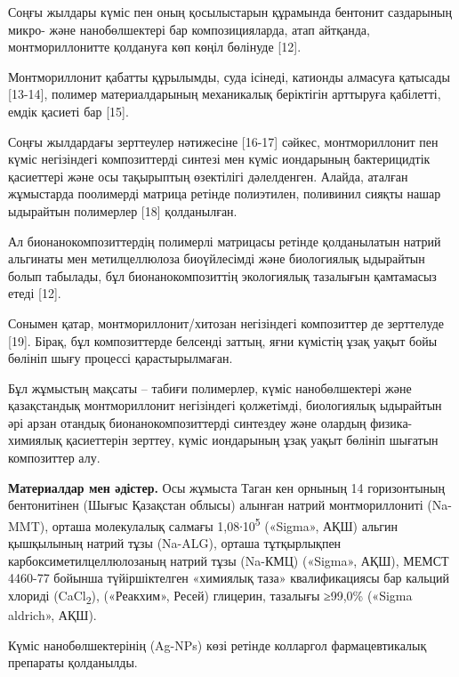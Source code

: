 Соңғы жылдары күміс пен оның қосылыстарын құрамында бентонит саздарының
микро- және нанобөлшектері бар композицияларда, атап айтқанда,
монтмориллонитте қолдануға көп көңіл бөлінуде {[}12{]}.

Монтмориллонит қабатты құрылымды, суда ісінеді, катионды алмасуға
қатысады {[}13-14{]}, полимер материалдарының механикалық беріктігін
арттыруға қабілетті, емдік қасиеті бар {[}15{]}.

Соңғы жылдардағы зерттеулер нәтижесіне {[}16-17{]} сәйкес,
монтмориллонит пен күміс негізіндегі композиттерді синтезі мен күміс
иондарының бактерицидтік қасиеттері және осы тақырыптың өзектілігі
дәлелденген. Алайда, аталған жұмыстарда поолимерді матрица ретінде
полиэтилен, поливинил сияқты нашар ыдырайтын полимерлер {[}18{]}
қолданылған.

Ал бионанокомпозиттердің полимерлі матрицасы ретінде қолданылатын натрий
альгинаты мен метилцеллюлоза биоүйлесімді және биологиялық ыдырайтын
болып табылады, бұл бионанокомпозиттің экологиялық тазалығын қамтамасыз
етеді {[}12{]}.

Сонымен қатар, монтмориллонит/хитозан негізіндегі композиттер де
зерттелуде {[}19{]}. Бірақ, бұл композиттерде белсенді заттың, яғни
күмістің ұзақ уақыт бойы бөлініп шығу процессі қарастырылмаған.

Бұл жұмыстың мақсаты -- табиғи полимерлер, күміс нанобөлшектері және
қазақстандық монтмориллонит негізіндегі қолжетімді, биологиялық
ыдырайтын әрі арзан отандық бионанокомпозиттерді синтездеу және олардың
физика-химиялық қасиеттерін зерттеу, күміс иондарының ұзақ уақыт бөлініп
шығатын композиттер алу.

{\bfseries Материалдар мен әдістер.} Осы жұмыста Таган кен орнының 14
горизонтының бентонитінен (Шығыс Қазақстан облысы) алынған натрий
монтмориллониті (Na-MMT), орташа молекулалық салмағы
1,08∙10\textsuperscript{5} («Sigma», АҚШ) альгин қышқылының натрий тұзы
(Na-ALG), орташа тұтқырлықпен карбоксиметилцеллюлозаның натрий тұзы
(Na-КМЦ) («Sigma», АҚШ), МЕМСТ 4460-77 бойынша түйіршіктелген «химиялық
таза» квалификациясы бар кальций хлориді (CaCl\textsubscript{2}),
(«Реакхим», Ресей) глицерин, тазалығы ≥99,0\% («Sigma aldrich», АҚШ).

Күміс нанобөлшектерінің (Ag-NPs) көзі ретінде колларгол фармацевтикалық
препараты қолданылды.

